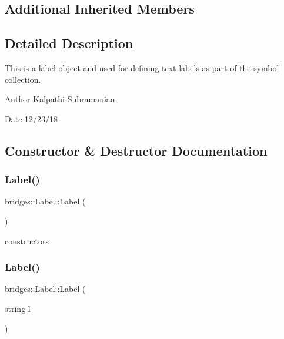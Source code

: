 \subsection*{Additional Inherited Members}


\subsection{Detailed Description}
This is a label object and used for defining text labels as part of the symbol collection. 

\begin{DoxyAuthor}{Author}
Kalpathi Subramanian 
\end{DoxyAuthor}
\begin{DoxyDate}{Date}
12/23/18 
\end{DoxyDate}


\subsection{Constructor \& Destructor Documentation}
\mbox{\label{classbridges_1_1_label_a6ecba5526127d5ed4d37bb38da560cc8}} 
\subsubsection{\texorpdfstring{Label()}{Label()}\hspace{0.1cm}{\footnotesize\ttfamily [1/2]}}
{\footnotesize\ttfamily bridges\+::\+Label\+::\+Label (\begin{DoxyParamCaption}{ }\end{DoxyParamCaption})\hspace{0.3cm}{\ttfamily [inline]}}

constructors \mbox{\label{classbridges_1_1_label_a339ddf0650b3e2aa7383ab58cb61e8fa}} 
\subsubsection{\texorpdfstring{Label()}{Label()}\hspace{0.1cm}{\footnotesize\ttfamily [2/2]}}
{\footnotesize\ttfamily bridges\+::\+Label\+::\+Label (\begin{DoxyParamCaption}\item[{string}]{l }\end{DoxyParamCaption})\hspace{0.3cm}{\ttfamily [inline]}}



